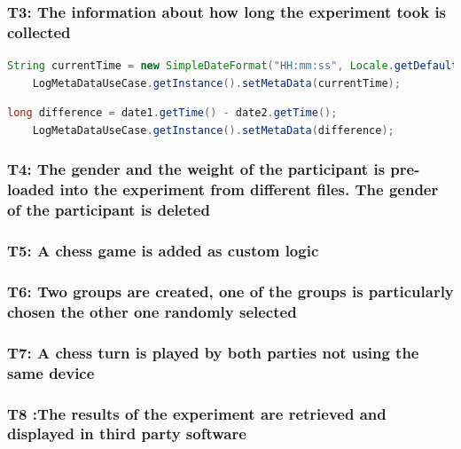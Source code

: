 \subsubsection*{T3: The information about how long the experiment took is collected}

\begin{lstlisting}[language=java,label=t3a,lineskip={0pt}, caption=Collect time needed to conduct experiment (a), basicstyle=\scriptsize, captionpos=b]
    String currentTime = new SimpleDateFormat("HH:mm:ss", Locale.getDefault()).format(new Date());
    LogMetaDataUseCase.getInstance().setMetaData(currentTime);
\end{lstlisting}

\begin{lstlisting}[language=java,label=t3b,lineskip={0pt}, caption=Collect time needed to conduct experiment (b), basicstyle=\scriptsize, captionpos=b]
    long difference = date1.getTime() - date2.getTime();
    LogMetaDataUseCase.getInstance().setMetaData(difference);
\end{lstlisting}


\subsubsection*{T4: The gender and the weight of the participant is pre-loaded into the experiment from different files. The gender of the participant is deleted}

\subsubsection*{T5: A chess game is added as custom logic}

\subsubsection*{T6: Two groups are created, one of the groups is particularly chosen the other one randomly selected}

\subsubsection*{T7: A chess turn is played by both parties not using the same device}

\subsubsection*{T8 :The results of the experiment are retrieved and displayed in third party software}

